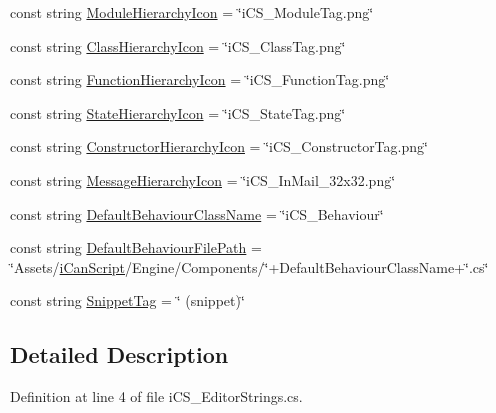 \begin{DoxyCompactItemize}
\item 
const string \hyperlink{classi_c_s___editor_strings_a8399fc9fdabedbbe9d2347862ece3fc0}{Module\+Hierarchy\+Icon} = \char`\"{}i\+C\+S\+\_\+\+Module\+Tag.\+png\char`\"{}
\item 
const string \hyperlink{classi_c_s___editor_strings_a04f48a5337419e926cb2f51e8cd9324f}{Class\+Hierarchy\+Icon} = \char`\"{}i\+C\+S\+\_\+\+Class\+Tag.\+png\char`\"{}
\item 
const string \hyperlink{classi_c_s___editor_strings_ab885aa4f445b504f01eabedf271c180e}{Function\+Hierarchy\+Icon} = \char`\"{}i\+C\+S\+\_\+\+Function\+Tag.\+png\char`\"{}
\item 
const string \hyperlink{classi_c_s___editor_strings_a0d374ee7a0f88f7def299d8b5538f4bd}{State\+Hierarchy\+Icon} = \char`\"{}i\+C\+S\+\_\+\+State\+Tag.\+png\char`\"{}
\item 
const string \hyperlink{classi_c_s___editor_strings_acd0b68646b2dce5786106559c055857c}{Constructor\+Hierarchy\+Icon} = \char`\"{}i\+C\+S\+\_\+\+Constructor\+Tag.\+png\char`\"{}
\item 
const string \hyperlink{classi_c_s___editor_strings_a4fe7d357b275d4999165b3aaca350107}{Message\+Hierarchy\+Icon} = \char`\"{}i\+C\+S\+\_\+\+In\+Mail\+\_\+32x32.\+png\char`\"{}
\item 
const string \hyperlink{classi_c_s___editor_strings_a3bba1e95fc209c83fc8f381fcca39ba7}{Default\+Behaviour\+Class\+Name} = \char`\"{}i\+C\+S\+\_\+\+Behaviour\char`\"{}
\item 
const string \hyperlink{classi_c_s___editor_strings_ac83b59617aa70de7db7c48c22db48fa6}{Default\+Behaviour\+File\+Path} = \char`\"{}Assets/\hyperlink{i_c_s___icons_8cs_a786a5465c68b5a5a2f1450c4d41e82c8a4210089875b85b95b562c5cb915915eb}{i\+Can\+Script}/Engine/Components/\char`\"{}+Default\+Behaviour\+Class\+Name+\char`\"{}.cs\char`\"{}
\item 
const string \hyperlink{classi_c_s___editor_strings_a76e5b89f9d0a9194809ba32f82c0e370}{Snippet\+Tag} = \char`\"{} (snippet)\char`\"{}
\end{DoxyCompactItemize}


\subsection{Detailed Description}


Definition at line 4 of file i\+C\+S\+\_\+\+Editor\+Strings.\+cs.



